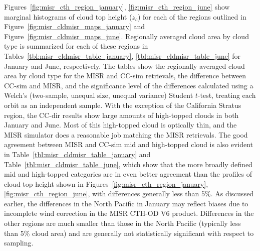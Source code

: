 Figures~\ref{fig:misr_cth_region_january}, \ref{fig:misr_cth_region_june}
show marginal histograms of cloud top height (\(z_c\)) for each of the
regions outlined in Figure~\ref{fig:misr_cldmisr_maps_january} and
Figure~\ref{fig:misr_cldmisr_maps_june}. Regionally averaged cloud area
by cloud type is summarized for each of these regions in
Tables~\ref{tbl:misr_cldmisr_table_january}, \ref{tbl:misr_cldmisr_table_june}
for January and June, respectively. The tables show the regionally
averaged cloud area by cloud type for the MISR and CC-sim retrievals,
the difference between CC-sim and MISR, and the significance level of
the differences calculated using a Welch's (two-sample, unequal size,
unequal variance) Student \(t\)-test, treating each orbit as an
independent sample. With the exception of the California Stratus region,
the CC-dir results show large amounts of high-topped clouds in both
January and June. Most of this high-topped cloud is optically thin, and
the MISR simulator does a reasonable job matching the MISR retrievals.
The good agreement between MISR and CC-sim mid and high-topped cloud is
also evident in Table~\ref{tbl:misr_cldmisr_table_january} and
Table~\ref{tbl:misr_cldmisr_table_june}, which show that the more
broadly defined mid and high-topped categories are in even better
agreement than the profiles of cloud top height shown in
Figures~\ref{fig:misr_cth_region_january}, \ref{fig:misr_cth_region_june},
with differences generally less than 5\%. As discussed earlier, the
differences in the North Pacific in January may reflect biases due to
incomplete wind correction in the MISR CTH-OD V6 product. Differences in
the other regions are much smaller than those in the North Pacific
(typically less than 5\% cloud area) and are generally not statistically
significant with respect to sampling.

